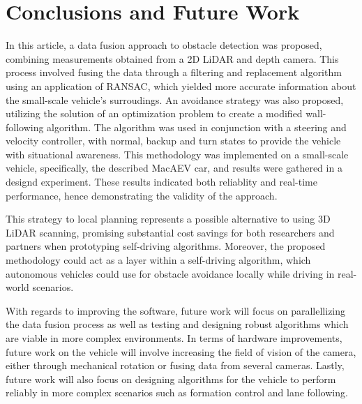 \documentclass[conference]{IEEEtran}
\begin{document}
\section{Conclusions and Future Work}
In this article, a data fusion approach to obstacle detection was proposed, combining measurements obtained from a 2D LiDAR and depth camera. This process involved fusing the data through a filtering and replacement algorithm using an application of RANSAC, which yielded more accurate information about the small-scale vehicle's surroudings. An avoidance strategy was also proposed, utilizing the solution of an optimization problem to create a modified wall-following algorithm. The algorithm was used in conjunction with  a steering and velocity controller, with normal, backup and turn states to provide the vehicle with situational awareness. This methodology was implemented on a small-scale vehicle, specifically, the described MacAEV car, and results were gathered in a designd experiment. These results indicated both reliablity and real-time performance, hence demonstrating the validity of the approach. 





This strategy to local planning represents a possible alternative to using 3D LiDAR scanning, promising substantial cost savings for both researchers and partners when prototyping self-driving algorithms. Moreover, the proposed methodology could act as a layer within a self-driving algorithm, which autonomous vehicles could use for obstacle avoidance locally while driving in real-world scenarios. 

With regards to improving the software, future work will focus on parallellizing the data fusion process as well as testing and designing robust algorithms which are viable in more complex environments. In terms of hardware improvements, future work on the vehicle will involve increasing the field of vision of the camera, either through mechanical rotation or fusing data from several cameras. Lastly, future work will also focus on designing algorithms for the vehicle to perform reliably in more complex scenarios such as formation control and lane following. 
\end{document}
